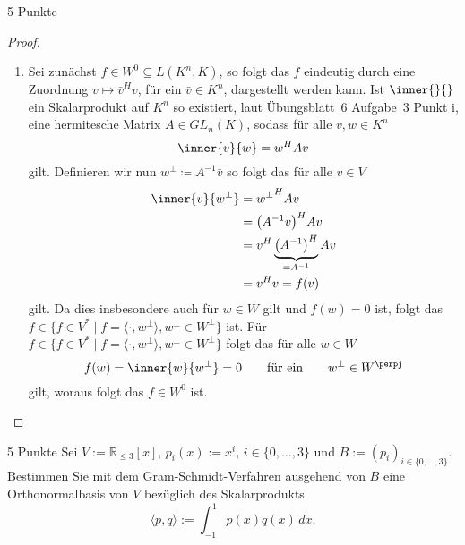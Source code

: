 \documentclass{problemset}
\begin{document}
\begin{problem}{5 Punkte}
\begin{proof}
\begin{enumerate}
        \item Sei zunächst \(f \in W^0 \subseteq L(K^n, K)\), so folgt das \(f\) eindeutig
              durch eine Zuordnung \(v \mapsto \bar{v}^H v\), für ein \(\bar{v} \in K^n\),
              dargestellt werden kann. Ist \(\inner{}{}\) ein Skalarprodukt auf \(K^n\) so
              existiert, laut Übungsblatt~6 Aufgabe~3 Punkt i, eine hermitesche Matrix \(A
              \in GL_n(K)\), sodass für alle \(v, w \in K^n\)
              \begin{equation*}
                  \inner{v}{w} = w^H A v
              \end{equation*}
              gilt.
              Definieren wir nun \(w^\perp \coloneq A^{-1} \bar{v}\) so folgt das für alle \(v \in V\)
              \begin{align*}
                  \inner{v}{w^\perp} & = {w^\perp}^H A v                                        \\
                                     & = {\left(A^{-1}v\right)}^H A v                           \\
                                     & = v^H \underbrace{{\left(A^{-1}\right)}^H}_{=A^{-1}} A v \\
                                     & = v^H v = f(v)
              \end{align*}
              gilt.
              Da dies insbesondere auch für \(w \in W\) gilt und \(f(w) = 0\) ist, folgt das \(f \in \{f \in
              V^* \mid f = \langle \cdot , w^\perp \rangle, w^\perp \in W^\perp\}\) ist.
              Für \(f \in \{f \in
              V^* \mid f = \langle \cdot , w^\perp \rangle, w^\perp \in W^\perp\}\) folgt das für alle \(w \in W\)
              \begin{equation*}
                  f(w) = \inner{w}{w^\perp} = 0 \qquad \text{für ein} \qquad w^\perp \in W^\perpj
              \end{equation*}
              gilt, woraus folgt das \(f \in W^0\) ist.
    \end{enumerate}
\end{proof}

\end{problem}

\begin{problem}{5 Punkte}
Sei $V := \mathbb{R}_{\leq 3}[x]$, $p_i(x) := x^i$, $i \in \{0, \ldots, 3\}$
und $B := (p_i)_{i \in \{0, \ldots, 3\}}$. Bestimmen Sie mit dem
Gram-Schmidt-Verfahren ausgehend von $B$ eine Orthonormalbasis von $V$
bezüglich des Skalarprodukts
\[
    \langle p, q \rangle := \int_{-1}^{1} p(x) q(x) \, dx.
\]
\end{problem}
\end{document}
